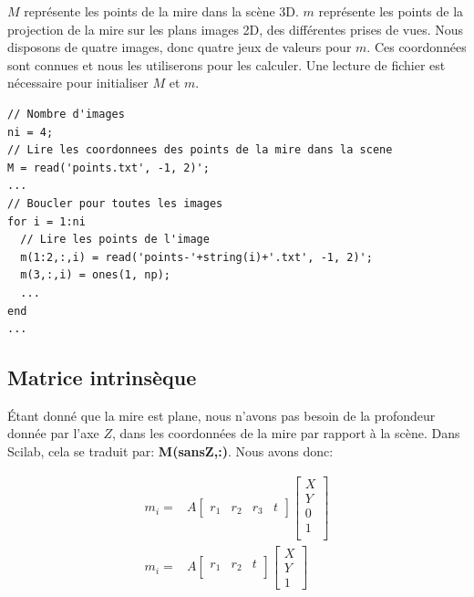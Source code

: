 \documentclass[a4paper,11pt]{article}
\begin{document}
$M$ représente les points de la mire dans la scène 3D. $m$ représente les points de la 
projection de la mire sur les plans images 2D, des différentes prises de vues. Nous disposons 
de quatre images, donc quatre 
jeux de valeurs pour $m$. Ces coordonnées sont connues et nous les utiliserons pour les 
calculer. Une lecture de fichier est nécessaire pour initialiser $M$ et $m$.\\


\begin{lstlisting}[caption=Lecture de fichier pour retrouver M et m]
// Nombre d'images
ni = 4;
// Lire les coordonnees des points de la mire dans la scene
M = read('points.txt', -1, 2)';
...
// Boucler pour toutes les images
for i = 1:ni
  // Lire les points de l'image
  m(1:2,:,i) = read('points-'+string(i)+'.txt', -1, 2)';
  m(3,:,i) = ones(1, np);
  ...
end
...
\end{lstlisting}


\subsection{Matrice intrinsèque}

Étant donné que la mire est plane, nous n'avons pas besoin de la profondeur donnée par 
l'axe $Z$, dans les coordonnées de la mire par rapport à la scène. Dans Scilab, cela se 
traduit par: \textbf{M(sansZ,:)}. Nous avons donc: 

\begin{equation}
  \begin{aligned}
    m_i=&A
    \begin{bmatrix}
    r_1 & r_2 & r_3 & t 
    \end{bmatrix}
    \begin{bmatrix}
    X \\ Y \\ 0 \\ 1\\ 
    \end{bmatrix}\\
    m_i=&A
    \begin{bmatrix}
    r_1 & r_2 & t\\
    \end{bmatrix}
    \begin{bmatrix}
    X \\ Y \\ 1
    \end{bmatrix}
  \end{aligned}
\end{equation}
\end{document}
